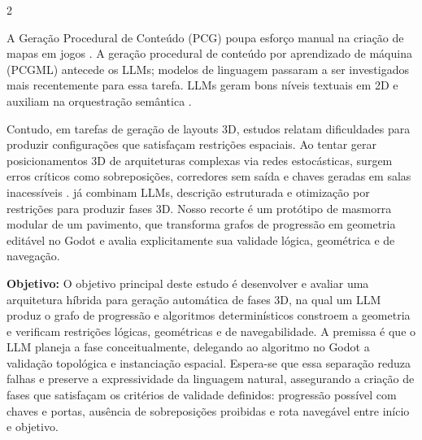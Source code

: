 \begin{paracol}{2}



{\fBody
A Geração Procedural de Conteúdo (PCG) poupa esforço manual na criação de mapas em jogos \cite{summerville2018procedural}. A geração procedural de conteúdo por aprendizado de máquina (PCGML) antecede os LLMs; modelos de linguagem passaram a ser investigados mais recentemente para essa tarefa. LLMs geram bons níveis textuais em 2D \cite{todd2023level} e auxiliam na orquestração semântica \cite{tang2025unrealllm}.

\vspace{3mm}

Contudo, em tarefas de geração de layouts 3D, estudos relatam dificuldades para produzir configurações que satisfaçam restrições espaciais. Ao tentar gerar posicionamentos 3D de arquiteturas complexas via redes estocásticas, surgem erros críticos como sobreposições, corredores sem saída e chaves geradas em salas inacessíveis \cite{xu2025constraint, sun2024roomplanner}. \textcite{xu2025constraint} já combinam LLMs, descrição estruturada e otimização por restrições para produzir fases 3D. Nosso recorte é um protótipo de masmorra modular de um pavimento, que transforma grafos de progressão em geometria editável no Godot e avalia explicitamente sua validade lógica, geométrica e de navegação.
}\par

\vspace{4mm}

\begin{caixaobj}
  \textbf{\color{sicverdescuro}Objetivo:\enspace}
  O objetivo principal deste estudo é desenvolver e avaliar uma arquitetura híbrida para geração automática de fases 3D, na qual um LLM produz o grafo de progressão e algoritmos determinísticos constroem a geometria e verificam restrições lógicas, geométricas e de navegabilidade. A premissa é que o LLM planeja a fase conceitualmente, delegando ao algoritmo no Godot a validação topológica e instanciação espacial. Espera-se que essa separação reduza falhas e preserve a expressividade da linguagem natural, assegurando a criação de fases que satisfaçam os critérios de validade definidos: progressão possível com chaves e portas, ausência de sobreposições proibidas e rota navegável entre início e objetivo.
\end{caixaobj}


\end{paracol}
